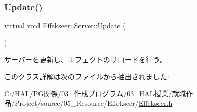 \subsubsection{\texorpdfstring{Update()}{Update()}}
{\footnotesize\ttfamily virtual \mbox{\hyperlink{namespace_effekseer_ab34c4088e512200cf4c2716f168deb56}{void}} Effekseer\+::\+Server\+::\+Update (\begin{DoxyParamCaption}{ }\end{DoxyParamCaption})\hspace{0.3cm}{\ttfamily [pure virtual]}}



サーバーを更新し、エフェクトのリロードを行う。 



このクラス詳解は次のファイルから抽出されました\+:\begin{DoxyCompactItemize}
\item 
C\+:/\+H\+A\+L/\+P\+G関係/03\+\_\+作成プログラム/03\+\_\+\+H\+A\+L授業/就職作品/\+Project/source/05\+\_\+\+Resource/\+Effekseer/\mbox{\hyperlink{_effekseer_8h}{Effekseer.\+h}}\end{DoxyCompactItemize}
